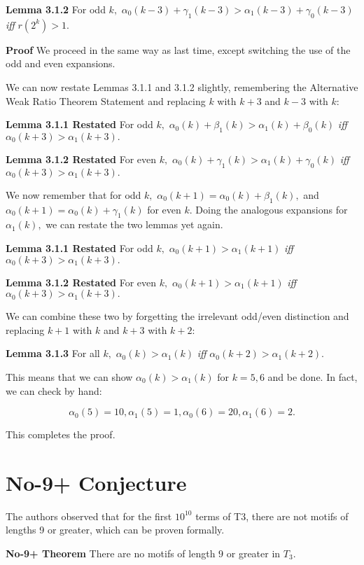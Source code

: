 \documentclass{article}
\begin{document}
\textbf{Lemma 3.1.2} For odd $k,$ $\alpha_0(k-3) + \gamma_1(k-3) > \alpha_1(k-3) + \gamma_0(k-3)$ \emph{iff} $r(2^k) > 1.$

\textbf{Proof} We proceed in the same way as last time, except switching the use of the odd and even expansions.

We can now restate Lemmas 3.1.1 and 3.1.2 slightly, remembering the Alternative Weak Ratio Theorem Statement and replacing $k$ with $k+3$ and $k-3$ with $k:$

\textbf{Lemma 3.1.1 Restated} For odd $k,$ $\alpha_0(k) + \beta_1(k) > \alpha_1(k) + \beta_0(k)$ \emph{iff} $\alpha_0(k+3) > \alpha_1(k+3).$

\textbf{Lemma 3.1.2 Restated} For even $k,$ $\alpha_0(k) + \gamma_1(k) > \alpha_1(k) + \gamma_0(k)$ \emph{iff} $\alpha_0(k+3) > \alpha_1(k+3).$

We now remember that for odd $k,$ $\alpha_0(k+1) = \alpha_0(k) + \beta_1(k),$ and $\alpha_0(k+1) = \alpha_0(k) + \gamma_1(k)$ for even $k.$ Doing the analogous expansions for $\alpha_1(k),$ we can restate the two lemmas yet again.

\textbf{Lemma 3.1.1 Restated} For odd $k,$ $\alpha_0(k+1) > \alpha_1(k+1)$ \emph{iff} $\alpha_0(k+3) > \alpha_1(k+3).$

\textbf{Lemma 3.1.2 Restated} For even $k,$ $\alpha_0(k+1) > \alpha_1(k+1)$ \emph{iff} $\alpha_0(k+3) > \alpha_1(k+3).$

We can combine these two by forgetting the irrelevant odd/even distinction and replacing $k+1$ with $k$ and $k+3$ with $k+2:$

\textbf{Lemma 3.1.3} For all $k,$ $\alpha_0(k) > \alpha_1(k)$ \emph{iff} $\alpha_0(k+2) > \alpha_1(k+2).$

This means that we can show $\alpha_0(k) > \alpha_1(k)$ for $k = 5, 6$ and be done. In fact, we can check by hand:

$$\alpha_0(5) = 10, \alpha_1(5) = 1, \alpha_0(6) = 20, \alpha_1(6) = 2.$$

This completes the proof.

\section{No-9+ Conjecture}
The authors observed that for the first $10^{10}$ terms of T3, there are not motifs of lengths 9 or greater, which can be proven formally.

\textbf{No-9+ Theorem} There are no motifs of length $9$ or greater in $T_3$.
\end{document}
